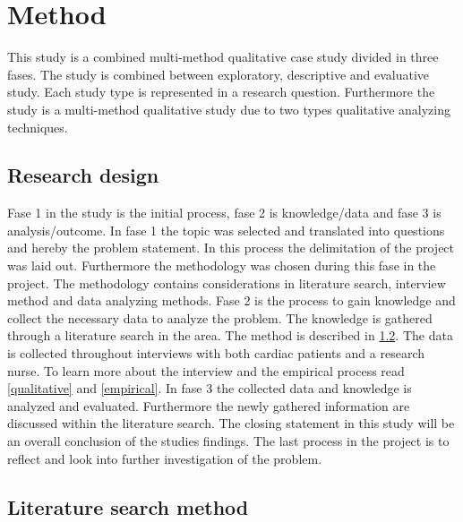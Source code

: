 \chapter{Method}

This study is a combined multi-method qualitative case study divided in three fases.
The study is combined between exploratory, descriptive and evaluative study. Each study type is represented in a research question. Furthermore the study is a multi-method qualitative study due to two types qualitative analyzing techniques. 
\section{Research design}


 Fase 1 in the study is the initial process, fase 2 is knowledge/data and fase 3 is analysis/outcome. 
In fase 1 the topic was selected and translated into questions and hereby the problem statement. In this process the delimitation of the project was laid out. Furthermore the methodology was chosen during this fase in the project. The methodology contains considerations in literature search, interview method and data analyzing methods. 
Fase 2 is the process to gain knowledge and collect the necessary data to analyze the problem. The knowledge is gathered through a literature search in the area. The method is described in \cref{literature}. The data is collected throughout interviews with both cardiac patients and a research nurse. To learn more about the interview and the empirical process read \cref{qualitative} and \cref{empirical}.
In fase 3 the collected data and knowledge is analyzed and evaluated. Furthermore the newly gathered information are discussed within the literature search. The closing statement in this study will be an overall conclusion of the studies findings. The last process in the project is to reflect and look into further investigation of the problem. 


\section{Literature search method}
\label{literature}

